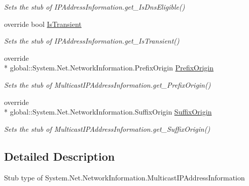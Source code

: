 \begin{DoxyCompactItemize}
\begin{DoxyCompactList}\small\item\em Sets the stub of I\-P\-Address\-Information.\-get\-\_\-\-Is\-Dns\-Eligible()\end{DoxyCompactList}\item 
override bool \hyperlink{class_system_1_1_net_1_1_network_information_1_1_fakes_1_1_stub_multicast_i_p_address_information_ae893cddc2b1b269241a85cefb2aeaecd}{Is\-Transient}
\begin{DoxyCompactList}\small\item\em Sets the stub of I\-P\-Address\-Information.\-get\-\_\-\-Is\-Transient()\end{DoxyCompactList}\item 
override \\*
global\-::\-System.\-Net.\-Network\-Information.\-Prefix\-Origin \hyperlink{class_system_1_1_net_1_1_network_information_1_1_fakes_1_1_stub_multicast_i_p_address_information_a3bd050dc4ed8a8117a240bc54f2078c2}{Prefix\-Origin}
\begin{DoxyCompactList}\small\item\em Sets the stub of Multicast\-I\-P\-Address\-Information.\-get\-\_\-\-Prefix\-Origin()\end{DoxyCompactList}\item 
override \\*
global\-::\-System.\-Net.\-Network\-Information.\-Suffix\-Origin \hyperlink{class_system_1_1_net_1_1_network_information_1_1_fakes_1_1_stub_multicast_i_p_address_information_a6a1aab8a43e1d64462f87645f8688cb9}{Suffix\-Origin}
\begin{DoxyCompactList}\small\item\em Sets the stub of Multicast\-I\-P\-Address\-Information.\-get\-\_\-\-Suffix\-Origin()\end{DoxyCompactList}\end{DoxyCompactItemize}


\subsection{Detailed Description}
Stub type of System.\-Net.\-Network\-Information.\-Multicast\-I\-P\-Address\-Information



